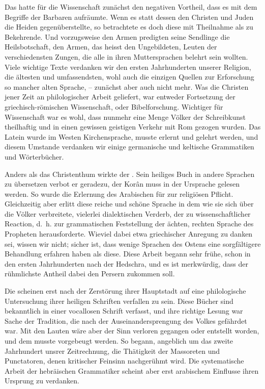 \label{I.IV.chistenthum}
Das  hatte für die Wissenschaft zunächst den negativen Vortheil, dass es mit dem Begriffe der Barbaren aufräumte. Wenn es statt dessen den Christen und Juden die Heiden gegenüberstellte, so betrachtete es doch diese mit Theilnahme als zu Bekehrende. Und vorzugsweise den Armen predigten seine Sendlinge die Heilsbotschaft, den Armen, das heisst den Ungebildeten, Leuten der verschiedensten Zungen, die alle in ihren Muttersprachen belehrt sein wollten. Viele wichtige Texte verdanken wir den ersten Jahrhunderten unserer Religion, die ältesten und umfassendsten, wohl auch die einzigen Quellen zur Erforschung so mancher alten Sprache, – zunächst aber auch nicht mehr. Was die Christen jener Zeit an philologischer Arbeit geliefert, war entweder Fortsetzung der griechisch-römischen Wissenschaft, oder Bibelforschung. Wichtiger für  Wissenschaft war es wohl, dass nunmehr eine Menge Völker der Schreibkunst theilhaftig und in einen gewissen geistigen Verkehr mit Rom gezogen wurden. Das Latein wurde im Westen Kirchensprache, musste erlernt und gelehrt werden, und diesem Umstande verdanken wir einige germanische und keltische Grammatiken und Wörterbücher.

\label{I.IV.islam}
Anders als das Christenthum wirkte der . Sein heiliges Buch in andere Sprachen zu übersetzen verbot er geradezu, der Korân muss in der Ursprache gelesen werden. So wurde die Erlernung des Arabischen für  zur religiösen Pflicht. Gleichzeitig aber erlitt diese reiche und schöne Sprache in dem  wie sie sich über die Völker \label{fp.21} verbreitete, vielerlei dialektischen Verderb, der zu wissenschaftlicher Reaction, d.~h. zur grammatischen Feststellung der ächten, rechten Sprache des Propheten herausforderte. Wieviel dabei etwa \label{sp.22} griechischer Anregung zu danken sei, wissen wir nicht; sicher ist, dass wenige Sprachen des Ostens eine sorgfältigere Behandlung erfahren haben als diese. Diese Arbeit begann sehr frühe, schon in den ersten Jahrhunderten nach der Hedschra, und es ist merkwürdig, dass der rühmlichste Antheil dabei den Persern zukommen soll. 

\label{I.IV.juden}
Die  scheinen erst nach der Zerstörung ihrer Hauptstadt auf eine philologische Untersuchung ihrer heiligen Schriften verfallen zu sein. Diese Bücher sind bekanntlich in einer vocallosen Schrift verfasst, und ihre richtige Lesung war Sache der Tradition, die nach der Auseinandersprengung des Volkes gefährdet war. Mit den Lauten wäre aber der Sinn verloren gegangen oder entstellt worden, und dem musste vorgebeugt werden. So begann, angeblich um das zweite Jahrhundert unsrer Zeitrechnung, die Thätigkeit der Massoreten und Punctatoren, denen kritischer Feinsinn nachgerühmt wird. Die systematische Arbeit der hebräischen Grammatiker scheint aber erst arabischem Einflusse ihren Ursprung zu verdanken.

